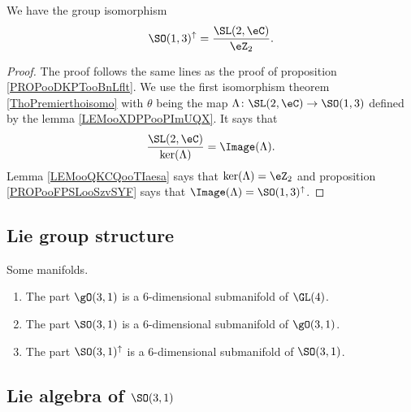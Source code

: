 \begin{theorem}
	We have the group isomorphism
	\begin{equation}
		\SO(1,3)^{\uparrow}=\frac{ \SL(2,\eC) }{ \eZ_2 }.
	\end{equation}
\end{theorem}

\begin{proof}
	The proof follows the same lines as the proof of proposition \ref{PROPooDKPTooBnLflt}. We use the first isomorphism theorem \ref{ThoPremierthoisomo} with \( \theta\) being the map \( \Lambda\colon \SL(2,\eC)\to \SO(1,3)\) defined by the lemma \ref{LEMooXDPPooPImUQX}. It says that
	\begin{equation}
		\frac{ \SL(2,\eC) }{ \ker(\Lambda) }=\Image(\Lambda).
	\end{equation}
	Lemma \ref{LEMooQKCQooTIaesa} says that \( \ker(\Lambda)=\eZ_2\) and proposition \ref{PROPooFPSLooSzvSYF} says that \( \Image(\Lambda)=\SO(1,3)^{\uparrow}\).
\end{proof}

\subsection{Lie group structure}

\begin{lemma}       \label{LEMooISDKooUnafZR}
	Some manifolds.
	\begin{enumerate}
		\item
		      The part \( \gO(3,1)\) is a \( 6\)-dimensional submanifold of \( \GL(4)\).
		\item
		      The part \( \SO(3,1)\) is a \( 6\)-dimensional submanifold of \( \gO(3,1)\).
		\item
		      The part \( \SO(3,1)^{\uparrow}\) is a \( 6\)-dimensional submanifold of \( \SO(3,1)\).
	\end{enumerate}
\end{lemma}


\subsection{Lie algebra of \( \SO(3,1)\)}


